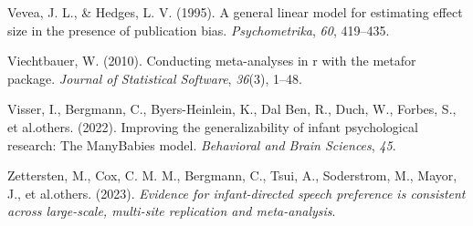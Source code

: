 \documentclass[
  man]{apa6}
\newlength{\cslhangindent}
\newlength{\cslentryspacingunit} %
\newenvironment{CSLReferences}[2] %
 {%
  \setlength{\parindent}{0pt}
  \ifodd #1
  \let\oldpar\par
  \def\par{\hangindent=\cslhangindent\oldpar}
  \fi
  \setlength{\parskip}{#2\cslentryspacingunit}
 }%
 {}
\begin{document}
\begin{CSLReferences}{1}{0}
\leavevmode{}%
Vevea, J. L., \& Hedges, L. V. (1995). A general linear model for estimating effect size in the presence of publication bias. \emph{Psychometrika}, \emph{60}, 419--435.

\leavevmode{}%
Viechtbauer, W. (2010). Conducting meta-analyses in r with the metafor package. \emph{Journal of Statistical Software}, \emph{36}(3), 1--48.

\leavevmode{}%
Visser, I., Bergmann, C., Byers-Heinlein, K., Dal Ben, R., Duch, W., Forbes, S., et al.others. (2022). Improving the generalizability of infant psychological research: The ManyBabies model. \emph{Behavioral and Brain Sciences}, \emph{45}.

\leavevmode{}%
Zettersten, M., Cox, C. M. M., Bergmann, C., Tsui, A., Soderstrom, M., Mayor, J., et al.others. (2023). \emph{Evidence for infant-directed speech preference is consistent across large-scale, multi-site replication and meta-analysis}.

\end{CSLReferences}
\end{document}

